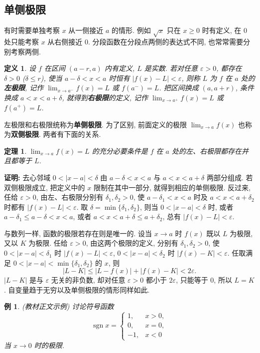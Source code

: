 \documentclass[UTF8,openany]{ctexbook}
\theoremstyle{chinesetextbook}
\newtheorem{definition}{定义}[section]
\newtheorem{example}{例}[section]
\newtheorem{theorem}{定理}[section]
\newenvironment{cnproof}{\par\indent\textbf{证明:} \ignorespaces}{\par}
\begin{document}
\subsection{单侧极限}
有时需要单独考察 $x$ 从一侧接近 $a$ 的情形. 例如 $\sqrt x$ 只在 $x\ge0$ 时有定义, 在 $0$ 处只能考察 $x$ 从右侧接近 $0$. 分段函数在分段点两侧的表达式不同, 也常常需要分别考察两侧.
\begin{definition}
设 $f$ 在区间 $(a-r,a)$ 内有定义, $L$ 是实数. 若对任意 $\varepsilon>0$, 都存在 $\delta>0$ ($\delta\le r$), 使当 $a-\delta<x<a$ 时恒有 $|f(x)-L|<\varepsilon$, 则称 $L$ 为 $f$ 在 $a$ 处的\textbf{左极限}, 记作 $\displaystyle\lim_{x\to a^-}f(x)=L$ 或 $f(a^-)=L$. 把区间换成 $(a,a+r)$, 条件换成 $a<x<a+\delta$, 就得到\textbf{右极限}的定义, 记作 $\displaystyle\lim_{x\to a^+}f(x)=L$ 或 $f(a^+)=L$.
\end{definition}
左极限和右极限统称为\textbf{单侧极限}. 为了区别, 前面定义的极限 $\displaystyle\lim_{x\to a}f(x)$ 也称为\textbf{双侧极限}. 两者有下面的关系.
\begin{theorem}\label{thm:5-onesided}
$\displaystyle\lim_{x\to a}f(x)=L$ 的充分必要条件是 $f$ 在 $a$ 处的左、右极限都存在并且都等于 $L$.
\end{theorem}
\begin{cnproof}
去心邻域 $0<|x-a|<\delta$ 由 $a-\delta<x<a$ 与 $a<x<a+\delta$ 两部分组成. 若双侧极限成立, 把定义中的 $x$ 限制在其中一部分, 就得到相应的单侧极限. 反过来, 任给 $\varepsilon>0$, 由左、右极限分别有 $\delta_1,\delta_2>0$, 使 $a-\delta_1<x<a$ 时及 $a<x<a+\delta_2$ 时都有 $|f(x)-L|<\varepsilon$. 取 $\delta=\min\{\delta_1,\delta_2\}$, 则当 $0<|x-a|<\delta$ 时, 或者 $a-\delta_1\le a-\delta<x<a$, 或者 $a<x<a+\delta\le a+\delta_2$, 总有 $|f(x)-L|<\varepsilon$.
\end{cnproof}
与数列一样, 函数的极限若存在则是唯一的. 设当 $x\to a$ 时 $f(x)$ 既以 $L$ 为极限, 又以 $K$ 为极限. 任给 $\varepsilon>0$, 由这两个极限的定义, 分别有 $\delta_1,\delta_2>0$, 使 $0<|x-a|<\delta_1$ 时 $|f(x)-L|<\varepsilon$, $0<|x-a|<\delta_2$ 时 $|f(x)-K|<\varepsilon$. 任取满足 $0<|x-a|<\min\{\delta_1,\delta_2\}$ 的 $x$, 则
\[
|L-K|\le|L-f(x)|+|f(x)-K|<2\varepsilon.
\]
$|L-K|$ 是与 $\varepsilon$ 无关的非负数, 却对任意 $\varepsilon>0$ 都小于 $2\varepsilon$, 只能等于 $0$, 所以 $L=K$. 自变量趋于无穷以及单侧极限的情形同样如此.
\begin{example}\label{ex:5-sgn}
\textnormal{(教材正文示例)} 讨论符号函数
\[
\operatorname{sgn}x=\begin{cases}1,&x>0,\\0,&x=0,\\-1,&x<0\end{cases}
\]
当 $x\to0$ 时的极限.
\end{example}
\end{document}
